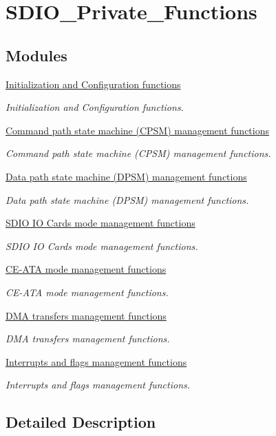 \hypertarget{group___s_d_i_o___private___functions}{}\section{S\+D\+I\+O\+\_\+\+Private\+\_\+\+Functions}
\label{group___s_d_i_o___private___functions}
\subsection*{Modules}
\begin{DoxyCompactItemize}
\item 
\hyperlink{group___s_d_i_o___group1}{Initialization and Configuration functions}
\begin{DoxyCompactList}\small\item\em Initialization and Configuration functions. \end{DoxyCompactList}\item 
\hyperlink{group___s_d_i_o___group2}{Command path state machine (\+C\+P\+S\+M) management functions}
\begin{DoxyCompactList}\small\item\em Command path state machine (C\+P\+S\+M) management functions. \end{DoxyCompactList}\item 
\hyperlink{group___s_d_i_o___group3}{Data path state machine (\+D\+P\+S\+M) management functions}
\begin{DoxyCompactList}\small\item\em Data path state machine (D\+P\+S\+M) management functions. \end{DoxyCompactList}\item 
\hyperlink{group___s_d_i_o___group4}{S\+D\+I\+O I\+O Cards mode management functions}
\begin{DoxyCompactList}\small\item\em S\+D\+I\+O I\+O Cards mode management functions. \end{DoxyCompactList}\item 
\hyperlink{group___s_d_i_o___group5}{C\+E-\/\+A\+T\+A mode management functions}
\begin{DoxyCompactList}\small\item\em C\+E-\/\+A\+T\+A mode management functions. \end{DoxyCompactList}\item 
\hyperlink{group___s_d_i_o___group6}{D\+M\+A transfers management functions}
\begin{DoxyCompactList}\small\item\em D\+M\+A transfers management functions. \end{DoxyCompactList}\item 
\hyperlink{group___s_d_i_o___group7}{Interrupts and flags management functions}
\begin{DoxyCompactList}\small\item\em Interrupts and flags management functions. \end{DoxyCompactList}\end{DoxyCompactItemize}


\subsection{Detailed Description}
